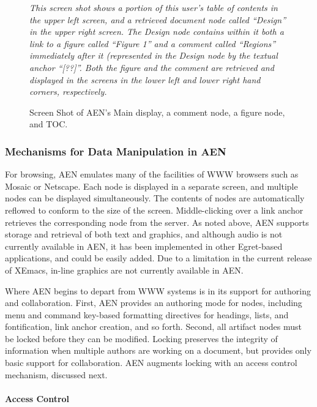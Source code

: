 \begin{figure}[htb]
 \centerline{}
 {\em This screen shot shows a portion of this 
 user's table of contents in the upper left screen, and a retrieved
 document node called ``Design'' in the upper right screen.  The Design
 node contains within it both a link to a figure called ``Figure 1'' and a
 comment called ``Regions'' immediately after it (represented in the
 Design node by the textual anchor ``[??]''.  Both the figure and the
 comment are retrieved and displayed in the screens in the lower left and
 lower right hand corners, respectively.}
 \caption{Screen Shot of AEN's Main display, a comment node, a figure node,
 and TOC.}
 \label{fig:Screen1}
\end{figure}


\subsubsection{Mechanisms for Data Manipulation in AEN}
\label{sec:mechanisms}

For browsing, AEN emulates many of the facilities of WWW browsers such as
Mosaic or Netscape.  Each node is displayed in a separate screen, and
multiple nodes can be displayed simultaneously.  The contents of nodes are
automatically reflowed to conform to the size of the screen.
Middle-clicking over a link anchor retrieves the corresponding node from
the server.  As noted above, AEN supports storage and retrieval of both
text and graphics, and although audio is not currently available in AEN, it
has been implemented in other Egret-based applications, and could be easily
added.  Due to a limitation in the current release of XEmacs, in-line
graphics are not currently available in AEN.

Where AEN begins to depart from WWW systems is in its support for
authoring and collaboration.  First, AEN provides an authoring mode
for nodes, including menu and command key-based formatting directives
for headings, lists, and fontification, link anchor creation, and so
forth.  Second, all artifact nodes must be locked before they can be
modified.  Locking preserves the integrity of information when
multiple authors are working on a document, but provides only basic
support for collaboration.  AEN augments locking with an access
control mechanism, discussed next.

\paragraph{Access Control}

